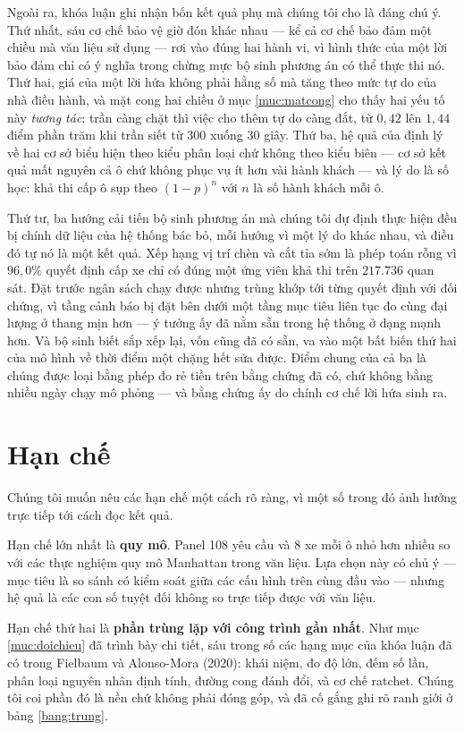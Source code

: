Ngoài ra, khóa luận ghi nhận bốn kết quả phụ mà chúng tôi cho là đáng chú ý. Thứ nhất, sáu cơ
chế bảo vệ giờ đón khác nhau --- kể cả cơ chế bảo đảm một chiều mà văn liệu sử dụng --- rơi vào
đúng hai hành vi, vì hình thức của một lời bảo đảm chỉ có ý nghĩa trong chừng mực bộ sinh
phương án có thể thực thi nó. Thứ hai, giá của một lời hứa không phải hằng số mà tăng theo mức
tự do của nhà điều hành, và mặt cong hai chiều ở mục \ref{muc:matcong} cho thấy hai yếu tố này
\emph{tương tác}: trần càng chặt thì việc cho thêm tự do càng đắt, từ $0{,}42$ lên $1{,}44$
điểm phần trăm khi trần siết từ 300 xuống 30 giây. Thứ ba, hệ quả của định lý về hai cơ sở
biểu hiện theo kiểu phân loại chứ không theo kiểu biên --- cơ sở kết quả mất nguyên cả ô chứ
không phục vụ ít hơn vài hành khách --- và lý do là số học: khả thi cấp ô sụp theo $(1-p)^{n}$
với $n$ là số hành khách mỗi ô.

Thứ tư, ba hướng cải tiến bộ sinh phương án mà chúng tôi dự định thực hiện đều bị chính dữ liệu
của hệ thống bác bỏ, mỗi hướng vì một lý do khác nhau, và điều đó tự nó là một kết quả. Xếp hạng
vị trí chèn và cắt tỉa sớm là phép toán rỗng vì $96{,}0\%$ quyết định cấp xe chỉ có đúng một ứng
viên khả thi trên $217.736$ quan sát. Đặt trước ngân sách chạy được nhưng trùng khớp tới từng
quyết định với đối chứng, vì tầng cảnh báo bị đặt bên dưới một tầng mục tiêu liên tục đo cùng
đại lượng ở thang mịn hơn --- ý tưởng ấy đã nằm sẵn trong hệ thống ở dạng mạnh hơn. Và bộ sinh
biết sắp xếp lại, vốn cũng đã có sẵn, va vào một bất biến thứ hai của mô hình về thời điểm một
chặng hết sửa được. Điểm chung của cả ba là chúng được loại bằng phép đo rẻ tiền trên bằng chứng
đã có, chứ không bằng nhiều ngày chạy mô phỏng --- và bằng chứng ấy do chính cơ chế lời hứa sinh
ra.

\section{Hạn chế}

Chúng tôi muốn nêu các hạn chế một cách rõ ràng, vì một số trong đó ảnh hưởng trực tiếp tới
cách đọc kết quả.

Hạn chế lớn nhất là \textbf{quy mô}. Panel 108 yêu cầu và 8 xe mỗi ô nhỏ hơn nhiều so với các
thực nghiệm quy mô Manhattan trong văn liệu. Lựa chọn này có chủ ý --- mục tiêu là so sánh có
kiểm soát giữa các cấu hình trên cùng đầu vào --- nhưng hệ quả là các con số tuyệt đối không so
trực tiếp được với văn liệu.

Hạn chế thứ hai là \textbf{phần trùng lặp với công trình gần nhất}. Như mục \ref{muc:doichieu} đã trình bày chi
tiết, sáu trong số các hạng mục của khóa luận đã có trong Fielbaum và Alonso-Mora (2020): khái
niệm, đo độ lớn, đếm số lần, phân loại nguyên nhân định tính, đường cong đánh đổi, và cơ chế
ratchet. Chúng tôi coi phần đó là nền chứ không phải đóng góp, và đã cố gắng ghi rõ ranh giới ở
bảng \ref{bang:trung}.


